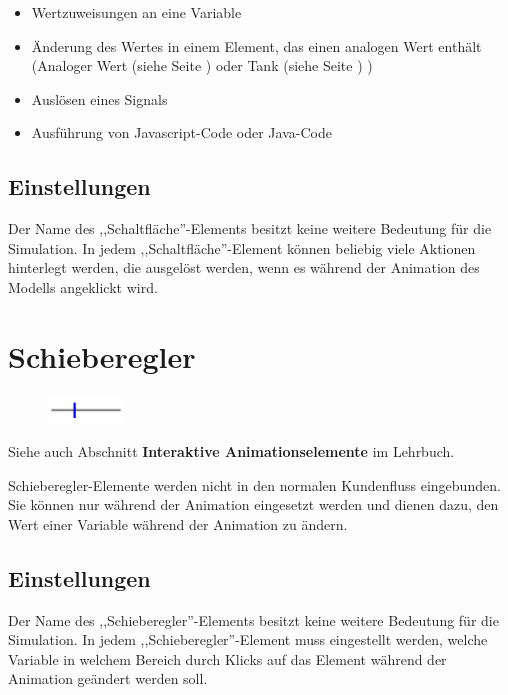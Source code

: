 \begin{itemize}
  \item Wertzuweisungen an eine Variable 
  \item Änderung des Wertes in einem Element, das einen analogen Wert enthält
  (Analoger Wert (siehe Seite \pageref{ref:ModelElementAnalogValue}) oder Tank (siehe Seite \pageref{ref:ModelElementTank}) )
  \item Auslösen eines Signals 
  \item Ausführung von Javascript-Code oder Java-Code 
\end{itemize}

\subsection*{Einstellungen}

Der Name des ,,Schaltfläche''-Elements besitzt keine weitere Bedeutung für die Simulation.
In jedem ,,Schaltfläche''-Element können beliebig viele Aktionen hinterlegt werden, die
ausgelöst werden, wenn es während der Animation des Modells angeklickt wird.


\section{Schieberegler}
\label{ref:ModelElementInteractiveSlider}

\begin{figure}
\vspace{-22pt}
\includegraphics[width=2cm]{imageModelElementInteractiveSlider.png}
\vspace{-22pt}
\end{figure}

Siehe auch Abschnitt \textbf{Interaktive Animationselemente} im Lehrbuch.

Schieberegler-Elemente werden nicht in den normalen Kundenfluss eingebunden.
Sie können nur während der Animation eingesetzt werden und dienen dazu,
den Wert einer Variable während der Animation zu ändern.

\subsection*{Einstellungen}

Der Name des ,,Schieberegler''-Elements besitzt keine weitere Bedeutung für die Simulation.
In jedem ,,Schieberegler''-Element muss eingestellt werden, welche Variable in welchem
Bereich durch Klicks auf das Element während der Animation geändert werden soll.





